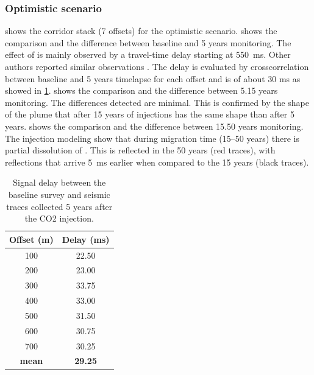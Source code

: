 \subsubsection{Optimistic scenario}
 shows the corridor stack (\num{7} offsets) for the
optimistic scenario.  shows the comparison and the
difference between baseline and \num{5} years monitoring. The effect of 
 is mainly observed by a travel-time delay starting at \SI{550}{\ms}. Other
authors reported similar observations \citep{Yang2014,Arts2004}. The delay is
evaluated by crosscorrelation between baseline and 5 years timelapse for each
offset and is of about 30 ms as showed in \cref{tbl:delay}.
 shows the comparison and the difference between
\numlist{5,15} years monitoring. The differences detected are minimal. This is
confirmed by the shape of the   plume that after \num{15} years of
injections has the same shape than after \num{5} years. 
shows the comparison and the difference between \numlist{15,50} years
monitoring. The   injection modeling show that during migration time
(\numrange{15}{50} years) there is partial dissolution of  . This is
reflected in the \num{50} years (red traces), with reflections that arrive
\SI{5}{\ms} earlier when compared to the \num{15} years (black traces).
\begin{table}[!bh]
  \centering
  \caption{Signal delay between the baseline survey and seismic traces collected
5 years after the CO2 injection.}
\begin{tabular}{@{}cc@{}}
\toprule
  Offset (m) & Delay (ms)\\
\midrule
 100   & 22.50  \\
 200   & 23.00  \\
 300   & 33.75  \\
 400   & 33.00  \\
 500   & 31.50  \\
 600   & 30.75  \\
 700   & 30.25  \\
 \textbf{mean}  & \textbf{29.25}  \\
\bottomrule
\end{tabular}
\label{tbl:delay}
\end{table}
